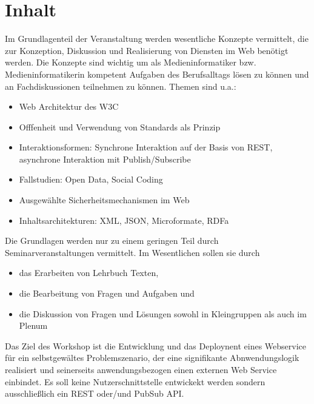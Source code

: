 \hypertarget{inhaltpathlabel....srcmodulbeschreibungen-bachelor-bpo5ba_web-development}{%
\section*{Inhalt\label{../../src/modulbeschreibungen-bachelor-bpo5/BA_Web-Development}}\label{inhaltpathlabel....srcmodulbeschreibungen-bachelor-bpo5ba_web-development}}

Im Grundlagenteil der Veranstaltung werden wesentliche Konzepte
vermittelt, die zur Konzeption, Diskussion und Realisierung von Diensten
im Web benötigt werden. Die Konzepte sind wichtig um als
Medieninformatiker bzw. Medieninformatikerin kompetent Aufgaben des
Berufsalltags lösen zu können und an Fachdiskussionen teilnehmen zu
können. Themen sind u.a.:

\begin{itemize}
\tightlist
\item
  Web Architektur des W3C
\item
  Offfenheit und Verwendung von Standards als Prinzip
\item
  Interaktionsformen: Synchrone Interaktion auf der Basis von REST,
  asynchrone Interaktion mit Publish/Subscribe
\item
  Fallstudien: Open Data, Social Coding
\item
  Ausgewählte Sicherheitsmechanismen im Web
\item
  Inhaltsarchitekturen: XML, JSON, Microformate, RDFa
\end{itemize}

Die Grundlagen werden nur zu einem geringen Teil durch
Seminarveranstaltungen vermittelt. Im Wesentlichen sollen sie durch

\begin{itemize}
\tightlist
\item
  das Erarbeiten von Lehrbuch Texten,
\item
  die Bearbeitung von Fragen und Aufgaben und
\item
  die Diskussion von Fragen und Lösungen sowohl in Kleingruppen als auch
  im Plenum
\end{itemize}

Das Ziel des Workshop ist die Entwicklung und das Deploynent eines
Webservice für ein selbstgewältes Problemszenario, der eine signifikante
Abnwendungslogik realisiert und seinerseits anwendungsbezogen einen
externen Web Service einbindet. Es soll keine Nutzerschnittstelle
entwickekt werden sondern ausschließlich ein REST oder/und PubSub API.

